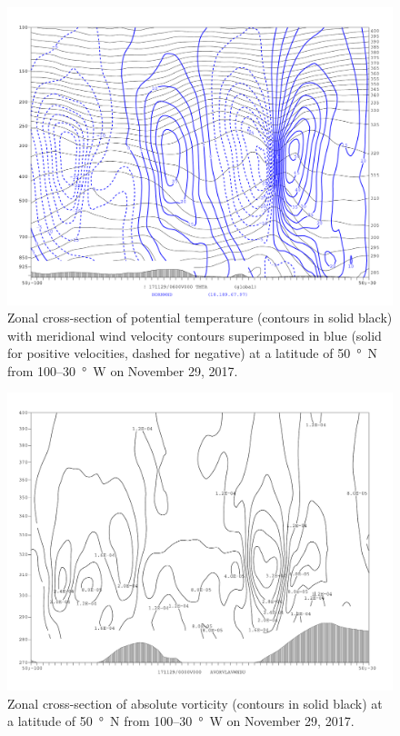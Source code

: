 \documentclass[11pt]{article}
\begin{document}
\begin{figure}[h!]
	\centering
	\includegraphics[width=\textwidth]{thta_normwnd_50N_zon_xsec} %
	\caption{Zonal cross-section of potential temperature (contours in solid black) with meridional wind velocity contours superimposed in blue (solid for positive velocities, dashed for negative) at a latitude of \SI{50}{\degree N} from 100--\SI{30}{\degree W} on November 29, 2017.}
	\label{fig:thta_normwnd_50N_zon_xsec}
\end{figure}

\begin{figure}[h!]
	\centering
	\includegraphics[width=\textwidth]{avor_theta_coord_50N_zon_xsec_0Z} %
	\caption{Zonal cross-section of absolute vorticity (contours in solid black) at a latitude of \SI{50}{\degree N} from 100--\SI{30}{\degree W} on November 29, 2017.}
	\label{fig:avor_theta_coord_50N_zon_xsec_0Z}
\end{figure}
\end{document}
